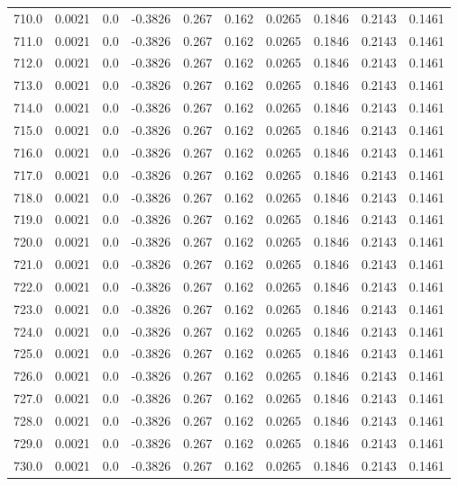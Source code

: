 \begin{longtable}{lrrrrrrrrr}
710.0 & 0.0021 & 0.0 & -0.3826 & 0.267 & 0.162 & 0.0265 & 0.1846 & 0.2143 & 0.1461 \\
711.0 & 0.0021 & 0.0 & -0.3826 & 0.267 & 0.162 & 0.0265 & 0.1846 & 0.2143 & 0.1461 \\
712.0 & 0.0021 & 0.0 & -0.3826 & 0.267 & 0.162 & 0.0265 & 0.1846 & 0.2143 & 0.1461 \\
713.0 & 0.0021 & 0.0 & -0.3826 & 0.267 & 0.162 & 0.0265 & 0.1846 & 0.2143 & 0.1461 \\
714.0 & 0.0021 & 0.0 & -0.3826 & 0.267 & 0.162 & 0.0265 & 0.1846 & 0.2143 & 0.1461 \\
715.0 & 0.0021 & 0.0 & -0.3826 & 0.267 & 0.162 & 0.0265 & 0.1846 & 0.2143 & 0.1461 \\
716.0 & 0.0021 & 0.0 & -0.3826 & 0.267 & 0.162 & 0.0265 & 0.1846 & 0.2143 & 0.1461 \\
717.0 & 0.0021 & 0.0 & -0.3826 & 0.267 & 0.162 & 0.0265 & 0.1846 & 0.2143 & 0.1461 \\
718.0 & 0.0021 & 0.0 & -0.3826 & 0.267 & 0.162 & 0.0265 & 0.1846 & 0.2143 & 0.1461 \\
719.0 & 0.0021 & 0.0 & -0.3826 & 0.267 & 0.162 & 0.0265 & 0.1846 & 0.2143 & 0.1461 \\
720.0 & 0.0021 & 0.0 & -0.3826 & 0.267 & 0.162 & 0.0265 & 0.1846 & 0.2143 & 0.1461 \\
721.0 & 0.0021 & 0.0 & -0.3826 & 0.267 & 0.162 & 0.0265 & 0.1846 & 0.2143 & 0.1461 \\
722.0 & 0.0021 & 0.0 & -0.3826 & 0.267 & 0.162 & 0.0265 & 0.1846 & 0.2143 & 0.1461 \\
723.0 & 0.0021 & 0.0 & -0.3826 & 0.267 & 0.162 & 0.0265 & 0.1846 & 0.2143 & 0.1461 \\
724.0 & 0.0021 & 0.0 & -0.3826 & 0.267 & 0.162 & 0.0265 & 0.1846 & 0.2143 & 0.1461 \\
725.0 & 0.0021 & 0.0 & -0.3826 & 0.267 & 0.162 & 0.0265 & 0.1846 & 0.2143 & 0.1461 \\
726.0 & 0.0021 & 0.0 & -0.3826 & 0.267 & 0.162 & 0.0265 & 0.1846 & 0.2143 & 0.1461 \\
727.0 & 0.0021 & 0.0 & -0.3826 & 0.267 & 0.162 & 0.0265 & 0.1846 & 0.2143 & 0.1461 \\
728.0 & 0.0021 & 0.0 & -0.3826 & 0.267 & 0.162 & 0.0265 & 0.1846 & 0.2143 & 0.1461 \\
729.0 & 0.0021 & 0.0 & -0.3826 & 0.267 & 0.162 & 0.0265 & 0.1846 & 0.2143 & 0.1461 \\
730.0 & 0.0021 & 0.0 & -0.3826 & 0.267 & 0.162 & 0.0265 & 0.1846 & 0.2143 & 0.1461 \\

\end{longtable}
